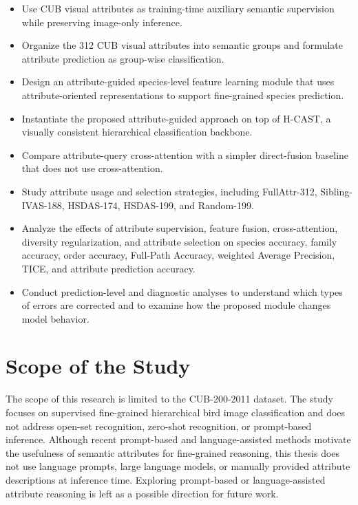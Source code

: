 \begin{itemize}
    \item Use CUB visual attributes as training-time auxiliary semantic supervision while preserving image-only inference.

    \item Organize the 312 CUB visual attributes into semantic groups and formulate attribute prediction as group-wise classification.

    \item Design an attribute-guided species-level feature learning module that uses attribute-oriented representations to support fine-grained species prediction.

    \item Instantiate the proposed attribute-guided approach on top of H-CAST, a visually consistent hierarchical classification backbone.

    \item Compare attribute-query cross-attention with a simpler direct-fusion baseline that does not use cross-attention.

    \item Study attribute usage and selection strategies, including FullAttr-312, Sibling-IVAS-188, HSDAS-174, HSDAS-199, and Random-199.

    \item Analyze the effects of attribute supervision, feature fusion, cross-attention, diversity regularization, and attribute selection on species accuracy, family accuracy, order accuracy, Full-Path Accuracy, weighted Average Precision, TICE, and attribute prediction accuracy.

    \item Conduct prediction-level and diagnostic analyses to understand which types of errors are corrected and to examine how the proposed module changes model behavior.
\end{itemize}






\section{Scope of the Study}

The scope of this research is limited to the CUB-200-2011 dataset. The study focuses on supervised fine-grained hierarchical bird image classification and does not address open-set recognition, zero-shot recognition, or prompt-based inference. Although recent prompt-based and language-assisted methods motivate the usefulness of semantic attributes for fine-grained reasoning, this thesis does not use language prompts, large language models, or manually provided attribute descriptions at inference time. Exploring prompt-based or language-assisted attribute reasoning is left as a possible direction for future work.

